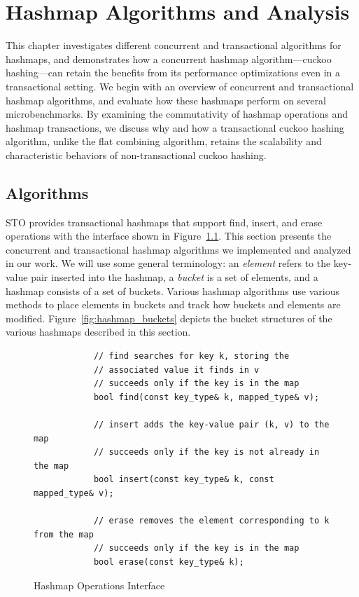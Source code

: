 \chapter{Hashmap Algorithms and Analysis}
\label{hashmap}

This chapter investigates different concurrent and transactional algorithms for hashmaps, and demonstrates how a concurrent hashmap algorithm---cuckoo hashing---can retain the benefits from its performance optimizations even in a transactional setting. We begin with an overview of concurrent and transactional hashmap algorithms, and evaluate how these hashmaps perform on several microbenchmarks. 
By examining the commutativity of hashmap operations and hashmap transactions, we discuss why and how a transactional cuckoo hashing algorithm, unlike the flat combining algorithm, retains the scalability and characteristic behaviors of non-transactional cuckoo hashing.

\section{Algorithms}

STO provides transactional hashmaps that support find, insert, and erase operations with the interface shown in Figure~\ref{fig:hm_interface}. 
This section presents the concurrent and transactional hashmap algorithms we implemented and analyzed in our work. We will use some general terminology: an \emph{element} refers to the key-value pair inserted into the hashmap, a \emph{bucket} is a set of elements, and a hashmap consists of a set of buckets. Various hashmap algorithms use various methods to place elements in buckets and track how buckets and elements are modified. Figure~\ref{fig:hashmap_buckets} depicts the bucket structures of the various hashmaps described in this section.

\begin{figure}[t]
    \centering
    \begin{lstlisting}
            // find searches for key k, storing the 
            // associated value it finds in v
            // succeeds only if the key is in the map
            bool find(const key_type& k, mapped_type& v); 
           
            // insert adds the key-value pair (k, v) to the map
            // succeeds only if the key is not already in the map
            bool insert(const key_type& k, const mapped_type& v); 

            // erase removes the element corresponding to k from the map
            // succeeds only if the key is in the map
            bool erase(const key_type& k); 
    \end{lstlisting}
    \caption{Hashmap Operations Interface}
    \label{fig:hm_interface}
\end{figure}

